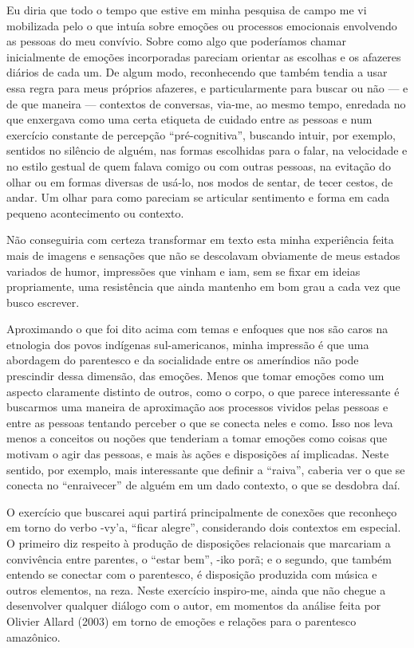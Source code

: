 Eu diria que todo o tempo que estive em minha pesquisa de campo me vi
mobilizada pelo o que intuía sobre emoções ou processos emocionais
envolvendo as pessoas do meu convívio. Sobre como algo que poderíamos
chamar inicialmente de emoções incorporadas pareciam orientar as
escolhas e os afazeres diários de cada um. De algum modo, reconhecendo
que também tendia a usar essa regra para meus próprios afazeres, e
particularmente para buscar ou não — e de que maneira — contextos de
conversas, via-me, ao mesmo tempo, enredada no que enxergava como uma
certa etiqueta de cuidado entre as pessoas e num exercício constante de
percepção ``pré-cognitiva'', buscando intuir, por exemplo, sentidos no
silêncio de alguém, nas formas escolhidas para o falar, na velocidade e
no estilo gestual de quem falava comigo ou com outras pessoas, na
evitação do olhar ou em formas diversas de usá-lo, nos modos de sentar,
de tecer cestos, de andar. Um olhar para como pareciam se articular
sentimento e forma em cada pequeno acontecimento ou contexto.

Não conseguiria com certeza transformar em texto esta minha experiência
feita mais de imagens e sensações que não se descolavam obviamente de
meus estados variados de humor, impressões que vinham e iam, sem se
fixar em ideias propriamente, uma resistência que ainda mantenho em bom
grau a cada vez que busco escrever.

Aproximando o que foi dito acima com temas e enfoques que nos são caros
na etnologia dos povos indígenas sul-americanos, minha impressão é que
uma abordagem do parentesco e da socialidade entre os ameríndios não
pode prescindir dessa dimensão, das emoções. Menos que tomar emoções
como um aspecto claramente distinto de outros, como o corpo, o que
parece interessante é buscarmos uma maneira de aproximação aos
processos vividos pelas pessoas e entre as pessoas tentando perceber o
que se conecta neles e como. Isso nos leva menos a conceitos ou noções
que tenderiam a tomar emoções como coisas que motivam o agir das
pessoas, e mais às ações e disposições aí implicadas. Neste sentido,
por exemplo, mais interessante que definir a ``raiva'', caberia ver o que
se conecta no ``enraivecer'' de alguém em um dado contexto, o que se
desdobra daí.

O exercício que buscarei aqui partirá principalmente de conexões que
reconheço em torno do verbo -vy’a, ``ficar alegre'', considerando dois
contextos em especial. O primeiro diz respeito à produção de
disposições relacionais que marcariam a convivência entre parentes, o
``estar bem'', -iko porã; e o segundo, que também entendo se conectar com
o parentesco, é disposição produzida com música e outros elementos, na
reza. Neste exercício inspiro-me, ainda que não chegue a desenvolver
qualquer diálogo com o autor, em momentos da análise feita por Olivier
Allard (2003) em torno de emoções e relações para o parentesco
amazônico.


